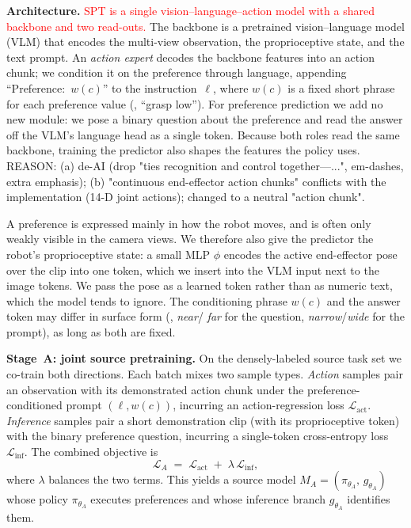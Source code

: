 \documentclass{article}
\begin{document}
\textbf{Architecture.}
  \textcolor{red}{SPT is a single vision--language--action model with a shared backbone and two
  read-outs.} The backbone is a pretrained vision--language model (VLM) that
  encodes the multi-view observation, the proprioceptive state, and the text
  prompt. An \emph{action expert} decodes the backbone features into an action
  chunk; we condition it on the preference through language, appending
  ``Preference:~$w(c)$'' to the instruction~$\ell$, where $w(c)$ is a fixed short
  phrase for each preference value (\eg, ``grasp low''). For preference
  prediction we add no new module: we pose a binary question about the preference
  and read the answer off the VLM's language head as a single token. Because both
  roles read the same backbone, training the predictor also shapes the features
  the policy uses.
REASON: (a) de-AI (drop "ties recognition and control together---...",
  em-dashes, extra emphasis); (b) "continuous end-effector action chunks"
  conflicts with the implementation (14-D joint actions); changed to a neutral
  "action chunk".

  A preference is expressed mainly in how the robot moves, and is often only
  weakly visible in the camera views. We therefore also give the predictor the
  robot's proprioceptive state: a small MLP $\phi$ encodes the active
  end-effector pose over the clip into one token, which we insert into the VLM
  input next to the image tokens. We pass the pose as a learned token rather than
  as numeric text, which the model tends to ignore. The conditioning phrase
  $w(c)$ and the answer token may differ in surface form (\eg, \emph{near}/%
  \emph{far} for the question, \emph{narrow}/\emph{wide} for the prompt), as long
  as both are fixed.

\textbf{Stage~A: joint source pretraining.}
On the densely-labeled source task set we co-train both directions. Each batch
mixes two sample types. \emph{Action} samples pair an observation with its
demonstrated action chunk under the preference-conditioned prompt
$(\ell, w(c))$, incurring an action-regression loss $\mathcal{L}_{\mathrm{act}}$.
\emph{Inference} samples pair a short demonstration clip (with its proprioceptive
token) with the binary preference question, incurring a single-token
cross-entropy loss $\mathcal{L}_{\mathrm{inf}}$. The combined objective is
\begin{equation}
  \mathcal{L}_{A} \;=\; \mathcal{L}_{\mathrm{act}} \;+\; \lambda\,\mathcal{L}_{\mathrm{inf}},
  \label{eq:stageA}
\end{equation}
where $\lambda$ balances the two terms. This yields a source model
$M_A=(\pi_{\theta_A},\,g_{\theta_A})$ whose policy $\pi_{\theta_A}$ executes
preferences and whose inference branch $g_{\theta_A}$ identifies them.
\end{document}
